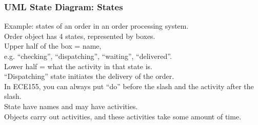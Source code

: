 \begin{frame}
\frametitle{UML State Diagram: States}

\begin{changemargin}{1cm}

Example: states of an order 
in an order processing system. \\

Order object has 4 states, represented by boxes.\\[1em]

Upper half of
the box = name,\\
\quad e.g. ``checking'', ``dispatching'', ``waiting'', ``delivered''.\\

Lower half = what the activity in that state is.\\[1em]

 ``Dispatching'' state initiates the delivery of the
order. \\[1em]

In ECE155, you can always put ``do'' before the slash
and the activity after the slash.\\[1em]

State have names and may have activities. \\
Objects carry out activities, and these activities take some amount of time.
\end{changemargin}
\end{frame}

